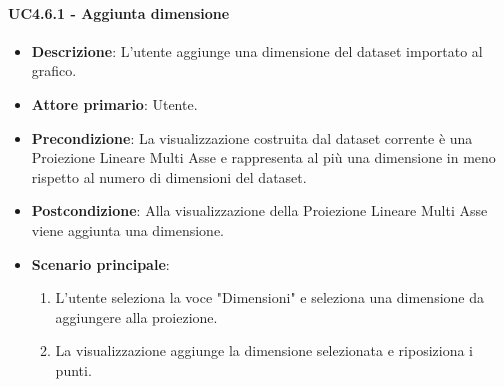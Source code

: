 \paragraph{UC4.6.1 - Aggiunta dimensione}
\label{par:uc4.6.1}
\begin{itemize}
    \item \textbf{Descrizione}: L’utente aggiunge una dimensione del dataset importato al grafico.

    \item \textbf{Attore primario}: Utente.

    \item \textbf{Precondizione}:   La visualizzazione costruita dal dataset corrente è una Proiezione Lineare Multi Asse
                                    e rappresenta al più una dimensione in meno rispetto al numero di dimensioni del dataset.
    \item \textbf{Postcondizione}:  Alla visualizzazione della Proiezione Lineare Multi Asse viene aggiunta una dimensione.

	\item \textbf{Scenario principale}:
        \begin{enumerate}
            \item L'utente seleziona la voce "Dimensioni" e seleziona una dimensione da aggiungere alla proiezione.
            \item La visualizzazione aggiunge la dimensione selezionata e riposiziona i punti.

        \end{enumerate}
\end{itemize}

